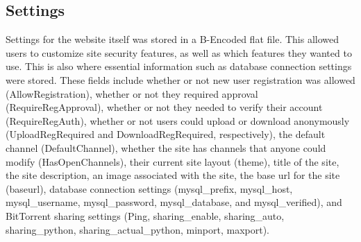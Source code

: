 \documentclass[a4paper,12pt]{report}
\begin{document}
\subsection{Settings}
Settings for the website itself was stored in a B-Encoded flat file. This allowed users to customize site security features, as well as which features they wanted to use. This is also where essential information such as database connection settings were stored. These fields include whether or not new user registration was allowed (AllowRegistration), whether or not they required approval (RequireRegApproval), whether or not they needed to verify their account (RequireRegAuth), whether or not users could upload or download anonymously (UploadRegRequired and DownloadRegRequired, respectively), the default channel (DefaultChannel), whether the site has channels that anyone could modify (HasOpenChannels), their current site layout (theme), title of the site, the site description, an image associated with the site, the base url for the site (baseurl), database connection settings (mysql\_prefix, mysql\_host, mysql\_username, mysql\_password, mysql\_database, and mysql\_verified), and BitTorrent sharing settings (Ping, sharing\_enable, sharing\_auto, sharing\_python, sharing\_actual\_python, minport, maxport).
\end{document}
